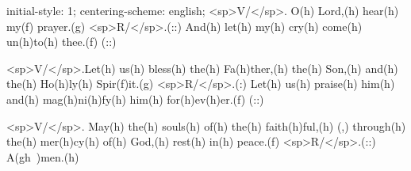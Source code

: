 initial-style: 1;
centering-scheme: english;
<sp>V/</sp>. O(h) Lord,(h) hear(h) my(f) prayer.(g) <sp>R/</sp>.(::) And(h) let(h) my(h) cry(h) come(h) un(h)to(h) thee.(f) (::)

<sp>V/</sp>.Let(h) us(h) bless(h) the(h) Fa(h)ther,(h) the(h) Son,(h) and(h) the(h) Ho(h)ly(h) Spir(f)it.(g) <sp>R/</sp>.(:) Let(h) us(h) praise(h) him(h) and(h) mag(h)ni(h)fy(h) him(h) for(h)ev(h)er.(f) (::) 

<sp>V/</sp>. May(h) the(h) souls(h) of(h) the(h) faith(h)ful,(h) (,) through(h) the(h) mer(h)cy(h) of(h) God,(h) rest(h) in(h) peace.(f) <sp>R/</sp>.(::)
A(gh~)men.(h)
